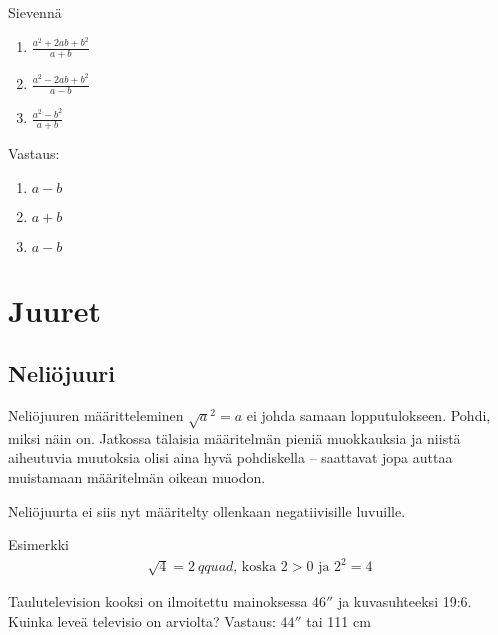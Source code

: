 \begin{tehtava}
Sievennä
\begin{enumerate}
\item $\frac{a^2+2ab+b^2}{a+b}$
\item $\frac{a^2-2ab+b^2}{a-b}$
\item $\frac{a^2-b^2}{a+b}$
\end{enumerate}
\begin{vastaus}
Vastaus:
\begin{enumerate}
\item $a-b$
\item $a+b$
\item $a-b$
\end{enumerate}
\end{vastaus}
\end{tehtava}

\chapter{Juuret}

\section{Neliöjuuri}


Neliöjuuren määritteleminen $\sqrt{a}^2=a$ ei johda samaan lopputulokseen. Pohdi, miksi näin on.
Jatkossa tälaisia määritelmän pieniä muokkauksia ja niistä aiheutuvia muutoksia olisi aina hyvä pohdiskella -- saattavat jopa auttaa muistamaan määritelmän oikean muodon.

Neliöjuurta ei siis nyt määritelty ollenkaan negatiivisille luvuille.


Esimerkki
\begin{align*}
\sqrt{4} = 2\ qquad\textrm{, koska $2>0$ ja $2^2 =4$} 
\end{align*}

Taulutelevision kooksi on ilmoitettu mainoksessa $46''$ ja kuvasuhteeksi 19:6. Kuinka leveä televisio on arviolta?
Vastaus: $44''$ tai 111 cm

